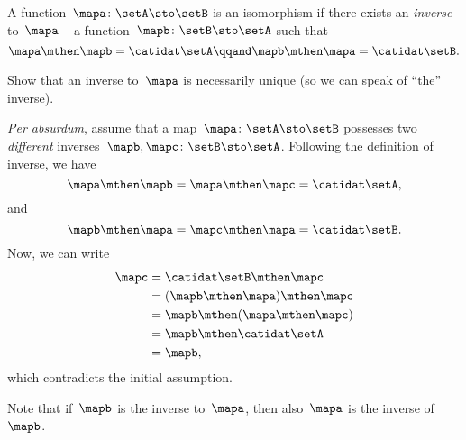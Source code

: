 \begin{ctdefinition}
    \label{def:function-isomorphism}
    A function~$\mapa \colon \setA \sto \setB$ is an isomorphism if there exists an \emph{inverse} to~$\mapa$ -- a function~$\mapb \colon \setB \sto \setA$ such that
    \begin{equation}
        \label{eq:isomorphism-equations}
        \mapa \mthen \mapb = \catidat\setA
        \qqand
        \mapb \mthen \mapa = \catidat\setB.
    \end{equation}
\end{ctdefinition}

\begin{exercise}
    Show that an inverse to~$\mapa$ is necessarily unique (so we can speak of ``the'' inverse).
\end{exercise}

\begin{solution}
    \emph{Per absurdum}, assume that a map~$\mapa\colon \setA \sto \setB$ possesses two \emph{different} inverses~$\mapb,\mapc\colon \setB \sto \setA$.
    Following the definition of inverse, we have
    \begin{equation}
        \mapa \mthen \mapb=\mapa \mthen \mapc=\catidat\setA,
    \end{equation}
    and
    \begin{equation}
        \mapb \mthen \mapa=\mapc \mthen \mapa=\catidat\setB.
    \end{equation}
    Now, we can write
    \begin{equation}
        \begin{aligned}
            \mapc & =\catidat\setB \mthen \mapc \\
                  & =(\mapb \mthen \mapa)\mthen \mapc \\
                  & =\mapb\mthen (\mapa \mthen \mapc) \\
                  & =\mapb \mthen \catidat\setA \\
                  & =\mapb,
        \end{aligned}
    \end{equation}
    which contradicts the initial assumption.
\end{solution}

\begin{remark}
    Note that if~$\mapb$ is the inverse to~$\mapa$, then also~$\mapa$ is the inverse of~$\mapb$.
\end{remark}

